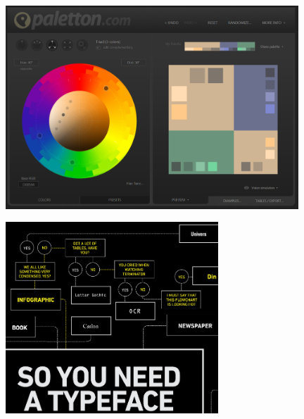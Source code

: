 \documentclass{beamer} %
\begin{document}
\begin{frame}

\begin{center}
\includegraphics[width=11cm]{assets/palette}
\end{center}

\end{frame}

\begin{frame}

\begin{center}
\includegraphics[width=8cm]{assets/crop}
\end{center}


\end{frame}
\end{document}
